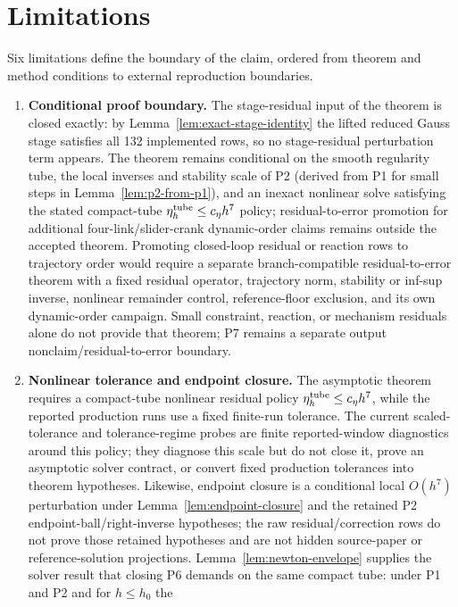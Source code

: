 \documentclass[preprint,12pt]{elsarticle}
\begin{document}
\section{Limitations}

Six limitations define the boundary of the claim, ordered from theorem and
method conditions to external reproduction boundaries.
\begin{enumerate}
  \item \textbf{Conditional proof boundary.} The stage-residual input of the
  theorem is closed exactly: by Lemma~\ref{lem:exact-stage-identity} the
  lifted reduced Gauss stage satisfies all 132 implemented rows, so no
  stage-residual perturbation term appears. The theorem remains conditional
  on the smooth regularity tube, the local inverses and stability scale of
  P2 (derived from P1 for small steps in Lemma~\ref{lem:p2-from-p1}), and an
  inexact nonlinear solve satisfying the stated compact-tube
  \(\eta_h^{\rm tube}\le c_\eta h^7\) policy; residual-to-error promotion for
  additional four-link/slider-crank dynamic-order claims remains outside the
  accepted theorem. Promoting closed-loop residual or reaction rows to
  trajectory order would require a separate branch-compatible
  residual-to-error theorem with a fixed residual operator, trajectory norm,
  stability or inf-sup inverse, nonlinear remainder control, reference-floor
  exclusion, and its own dynamic-order campaign. Small constraint, reaction,
  or mechanism residuals alone do not provide that theorem; P7 remains a
  separate output nonclaim/residual-to-error boundary.
  \item \textbf{Nonlinear tolerance and endpoint closure.} The asymptotic
  theorem requires a compact-tube nonlinear residual policy
  \(\eta_h^{\rm tube}\le c_\eta h^7\), while the
  reported production runs use a fixed finite-run tolerance. The current
  scaled-tolerance and tolerance-regime probes are finite reported-window
  diagnostics around this policy; they diagnose this scale but do not close
  it, prove an asymptotic solver contract, or convert fixed production
  tolerances into theorem hypotheses. Likewise, endpoint closure is a conditional
  local \(O(h^7)\) perturbation under Lemma~\ref{lem:endpoint-closure}
  and the retained P2 endpoint-ball/right-inverse hypotheses; the raw
  residual/correction rows do not prove those retained hypotheses and are
  not hidden source-paper or reference-solution projections.
  Lemma~\ref{lem:newton-envelope} supplies the solver result that closing P6
  demands on the same compact tube: under P1 and P2 and for $h\le h_0$ the

\end{enumerate}
\end{document}
